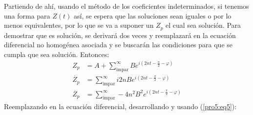 \begin{multicols}{2}
Partiendo de ahí, usando el método de los coeficientes indeterminados, si tenemos una forma para $Z(t)$ así, se espera que las soluciones sean iguales o por lo menos equivalentes, por lo que se va a suponer un $Z_p$ el cual sea solución. Para demostrar que es solución, se derivará dos veces y reemplazará en la ecuación diferencial no homogénea asociada y se buscarán las condiciones para que se cumpla que sea solución. Entonces:
\begin{align*}
    Z_p &= A + \sum_{\mathrm{impar}}^{\infty} B e^{i\left(2nt - \frac{\pi}{2} - \varphi\right)}\\
    \dot{Z_p} &= \sum_{\mathrm{impar}}^{\infty} i2nB e^{i\left(2nt - \frac{\pi}{2} - \varphi\right)}\\
    \ddot{Z_p} &= \sum_{\mathrm{impar}}^{\infty} -4n^{2}B^{2} e^{i\left(2nt - \frac{\pi}{2} - \varphi\right)}
\end{align*}
Reemplazando en la ecuación diferencial, desarrollando y usando (\ref{pro5:eq5}):
\end{multicols}

